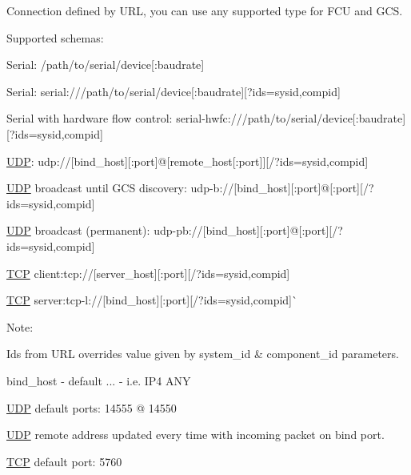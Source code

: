 Connection defined by U\+RL, you can use any supported type for F\+CU and G\+CS.

Supported schemas\+:


\begin{DoxyItemize}
\item Serial\+: {\ttfamily /path/to/serial/device\mbox{[}\+:baudrate\mbox{]}}
\item Serial\+: {\ttfamily serial\+:///path/to/serial/device\mbox{[}\+:baudrate\mbox{]}\mbox{[}?ids=sysid,compid\mbox{]}}
\item Serial with hardware flow control\+: {\ttfamily serial-\/hwfc\+:///path/to/serial/device\mbox{[}\+:baudrate\mbox{]}\mbox{[}?ids=sysid,compid\mbox{]}}
\item \mbox{\hyperlink{classUDP}{U\+DP}}\+: {\ttfamily udp\+://\mbox{[}bind\+\_\+host\mbox{]}\mbox{[}\+:port\mbox{]}@\mbox{[}remote\+\_\+host\mbox{[}\+:port\mbox{]}\mbox{]}\mbox{[}/?ids=sysid,compid\mbox{]}}
\item \mbox{\hyperlink{classUDP}{U\+DP}} broadcast until G\+CS discovery\+: {\ttfamily udp-\/b\+://\mbox{[}bind\+\_\+host\mbox{]}\mbox{[}\+:port\mbox{]}@\mbox{[}\+:port\mbox{]}\mbox{[}/?ids=sysid,compid\mbox{]}}
\item \mbox{\hyperlink{classUDP}{U\+DP}} broadcast (permanent)\+: {\ttfamily udp-\/pb\+://\mbox{[}bind\+\_\+host\mbox{]}\mbox{[}\+:port\mbox{]}@\mbox{[}\+:port\mbox{]}\mbox{[}/?ids=sysid,compid\mbox{]}}
\item {\ttfamily \mbox{\hyperlink{classTCP}{T\+CP}} client\+:}tcp\+://\mbox{[}server\+\_\+host\mbox{]}\mbox{[}\+:port\mbox{]}\mbox{[}/?ids=sysid,compid\mbox{]}{\ttfamily }
\item {\ttfamily \mbox{\hyperlink{classTCP}{T\+CP}} server\+:}tcp-\/l\+://\mbox{[}bind\+\_\+host\mbox{]}\mbox{[}\+:port\mbox{]}\mbox{[}/?ids=sysid,compid\mbox{]}\`{}
\end{DoxyItemize}

Note\+:


\begin{DoxyItemize}
\item Ids from U\+RL overrides value given by system\+\_\+id \& component\+\_\+id parameters.
\item bind\+\_\+host -\/ default {...} -\/ i.\+e. I\+P4 A\+NY
\item \mbox{\hyperlink{classUDP}{U\+DP}} default ports\+: 14555 @ 14550
\item \mbox{\hyperlink{classUDP}{U\+DP}} remote address updated every time with incoming packet on bind port.
\item \mbox{\hyperlink{classTCP}{T\+CP}} default port\+: 5760
\end{DoxyItemize}


